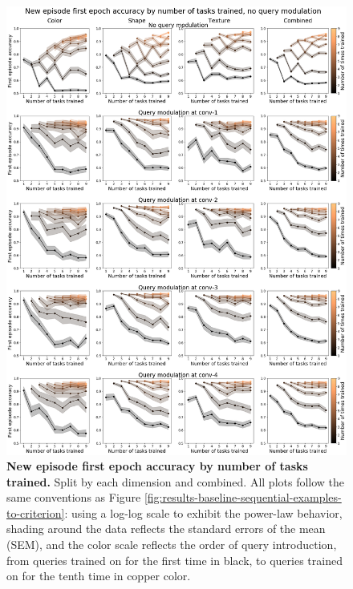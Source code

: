\begin{figure}[!htb]
\centering
\includegraphics[width=\linewidth]{ch-results/figures/query_mod_benchmark/first_episode_accuracy_per_modualtion_level_tasks_trained.png}
\caption{ {\bf New episode first epoch accuracy by number of tasks trained.} Split by each dimension and combined. All plots follow the same conventions as Figure \ref{fig:results-baseline-sequential-examples-to-criterion}: using a log-log scale to exhibit the power-law behavior, shading around the data reflects the standard errors of the mean (SEM), and the color scale reflects the order of query introduction, from queries trained on for the first time in black, to queries trained on for the tenth time in copper color. }
\label{fig:results-query-mod-benchmark-first-episode-accuracy-per-modualtion-level-tasks-trained}
\end{figure}
